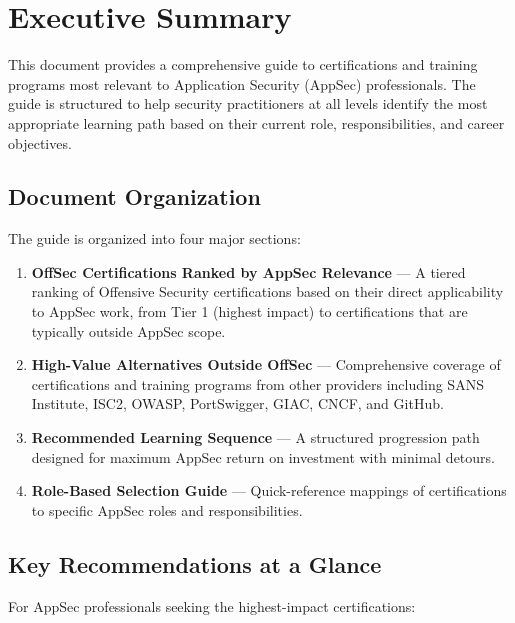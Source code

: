 \documentclass[11pt,letterpaper]{article}
\begin{document}
\section{Executive Summary}

This document provides a comprehensive guide to certifications and training programs most relevant to Application Security (AppSec) professionals. The guide is structured to help security practitioners at all levels identify the most appropriate learning path based on their current role, responsibilities, and career objectives.

\subsection{Document Organization}

The guide is organized into four major sections:

\begin{enumerate}[leftmargin=*]
    \item \textbf{OffSec Certifications Ranked by AppSec Relevance} --- A tiered ranking of Offensive Security certifications based on their direct applicability to AppSec work, from Tier 1 (highest impact) to certifications that are typically outside AppSec scope.

    \item \textbf{High-Value Alternatives Outside OffSec} --- Comprehensive coverage of certifications and training programs from other providers including SANS Institute, ISC2, OWASP, PortSwigger, GIAC, CNCF, and GitHub.

    \item \textbf{Recommended Learning Sequence} --- A structured progression path designed for maximum AppSec return on investment with minimal detours.

    \item \textbf{Role-Based Selection Guide} --- Quick-reference mappings of certifications to specific AppSec roles and responsibilities.
\end{enumerate}

\subsection{Key Recommendations at a Glance}

For AppSec professionals seeking the highest-impact certifications:
\end{document}

